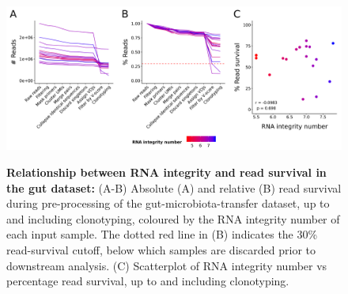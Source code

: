 \begin{figure}
\centering
\includegraphics[width = \textwidth]{_Figures/png/gut-read-survival-all-rin.png}
\begin{subfigure}{0em}
\label{fig:igseq-gut-read-survival-all-rin-abs}
\end{subfigure}
\begin{subfigure}{0em}
\label{fig:igseq-gut-read-survival-all-rin-rel}
\end{subfigure}
\begin{subfigure}{0em}
\label{fig:igseq-gut-read-survival-all-rin-scatter}
\end{subfigure}
\caption[Relationship between RNA integrity and read survival in the gut \igseq dataset]{\textbf{Relationship between RNA integrity and read survival in the gut \igseq dataset:} (A-B) Absolute (A) and relative (B) read survival during pre-processing of the \igseq gut-microbiota-transfer dataset, up to and including clonotyping, coloured by the RNA integrity number of each input sample. The dotted red line in (B) indicates the 30\% read-survival cutoff, below which samples are discarded prior to downstream analysis. (C) Scatterplot of RNA integrity number vs percentage read survival, up to and including clonotyping.}
\label{fig:igseq-gut-read-survival-all-rin}
\end{figure}

